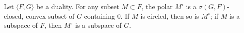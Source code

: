 Let $\langle F, G \rangle$ be a duality. For any subset $M \subset F$, the polar $M^\circ$ is a $\sigma(G, F)$-closed, convex subset of $G$ containing $0$. If $M$ is circled, then so is $M^\circ$; if $M$ is a subspace of $F$, then $M^\circ$ is a subspace of $G$.
